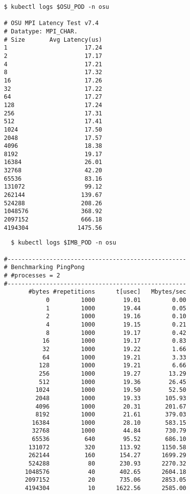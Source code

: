 \begin{minipage}[t]{0.48\textwidth}
\begin{verbatim}
$ kubectl logs $OSU_POD -n osu

# OSU MPI Latency Test v7.4
# Datatype: MPI_CHAR.
# Size       Avg Latency(us)
1                      17.24
2                      17.17
4                      17.21
8                      17.32
16                     17.26
32                     17.22
64                     17.27
128                    17.24
256                    17.31
512                    17.41
1024                   17.50
2048                   17.57
4096                   18.38
8192                   19.17
16384                  26.01
32768                  42.20
65536                  83.16
131072                 99.12
262144                139.67
524288                208.26
1048576               368.92
2097152               666.18
4194304              1475.56
\end{verbatim}
\end{minipage}
\hfill
\begin{minipage}[t]{0.48\textwidth}
\begin{verbatim}
  $ kubectl logs $IMB_POD -n osu

#---------------------------------------------------
# Benchmarking PingPong
# #processes = 2
#---------------------------------------------------
       #bytes #repetitions      t[usec]   Mbytes/sec
            0         1000        19.01         0.00
            1         1000        19.44         0.05
            2         1000        19.16         0.10
            4         1000        19.15         0.21
            8         1000        19.17         0.42
           16         1000        19.17         0.83
           32         1000        19.22         1.66
           64         1000        19.21         3.33
          128         1000        19.21         6.66
          256         1000        19.27        13.29
          512         1000        19.36        26.45
         1024         1000        19.50        52.50
         2048         1000        19.33       105.93
         4096         1000        20.31       201.67
         8192         1000        21.61       379.03
        16384         1000        28.10       583.15
        32768         1000        44.84       730.79
        65536          640        95.52       686.10
       131072          320       113.92      1150.58
       262144          160       154.27      1699.29
       524288           80       230.93      2270.32
      1048576           40       402.65      2604.18
      2097152           20       735.06      2853.05
      4194304           10      1622.56      2585.00
\end{verbatim}
\end{minipage}
\\

